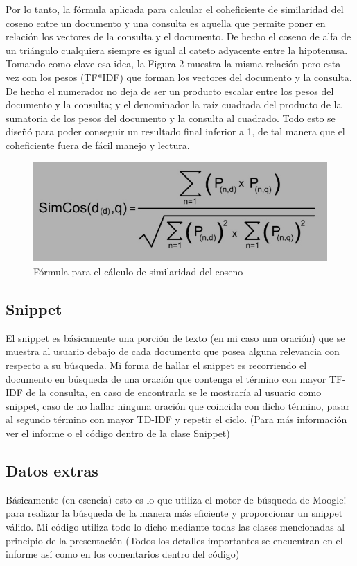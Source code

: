 \documentclass[a4paper,12pt]{article}
\begin{document}
Por lo tanto, la fórmula aplicada para calcular el coheficiente de similaridad del coseno entre un documento y una consulta es aquella que permite poner en relación los vectores de la consulta y el documento. De hecho el coseno de alfa de un triángulo cualquiera siempre es igual al cateto adyacente entre la hipotenusa. Tomando como clave esa idea, la Figura 2 muestra la misma relación pero esta vez con los pesos (TF*IDF) que forman los vectores del documento y la consulta. De hecho el numerador no deja de ser un producto escalar entre los pesos del documento y la consulta; y el denominador la raíz cuadrada del producto de la sumatoria de los pesos del documento y la consulta al cuadrado. Todo esto se diseñó para poder conseguir un resultado final inferior a 1, de tal manera que el coheficiente fuera de fácil manejo y lectura.

\begin{figure}[h]
    \center
    \includegraphics[width=14cm]{formula.jpg}
    \caption{Fórmula para el cálculo de similaridad del coseno}
\end{figure}

\subsection{Snippet}
El snippet es básicamente una porción de texto (en mi caso una oración) que se muestra al usuario debajo de cada documento que posea alguna relevancia con respecto a su búsqueda. Mi forma de hallar el snippet es recorriendo el documento en búsqueda de una oración que contenga el término con mayor TF-IDF de la consulta, en caso de encontrarla se le mostraría al usuario como snippet, caso de no hallar ninguna oración que coincida con dicho término, pasar al segundo término con mayor TD-IDF y repetir el ciclo. (Para más información ver el informe o el código dentro de la clase Snippet)

\subsection{Datos extras}
Básicamente (en esencia) esto es lo que utiliza el motor de búsqueda de Moogle! para realizar la búsqueda de la manera más eficiente y proporcionar un snippet válido. Mi código utiliza todo lo dicho mediante todas las clases mencionadas al principio de la presentación (Todos los detalles importantes se encuentran en el informe así como en los comentarios dentro del código) 
\end{document}
